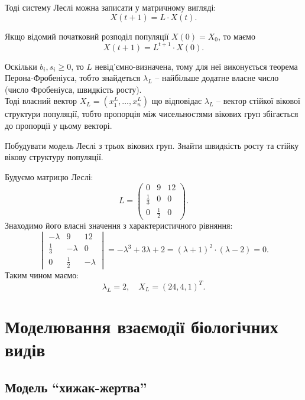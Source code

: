 Тоді систему Леслі можна записати у матричному вигляді:
\begin{equation}
    X(t + 1) = L \cdot X(t).
\end{equation}

Якщо відомий початковий розподіл популяції $X(0) = X_0$, то маємо 
\begin{equation}
    X(t + 1) = L^{t + 1} \cdot X(0).
\end{equation}

Оскільки $b_i, s_i \ge 0$, то $L$ невід'ємно-визначена, тому для неї виконується теорема Перона-Фробеніуса, тобто знайдеться $\lambda_L$ -- найбільше додатне власне число (число Фробеніуса, швидкість росту). \\

Тоді власний вектор $X_L = \left( x_1^L, \ldots, x_n^L \right)$ що відповідає $\lambda_L$ -- вектор стійкої вікової структури популяції, тобто пропорція між чисельностями вікових груп збігається до пропорції у цьому векторі.

\begin{example*}
    Побудувати модель Леслі з трьох вікових груп. Знайти швидкість росту та стійку вікову структуру популяції.
\end{example*}

\begin{solution}
    Будуємо матрицю Леслі:
    \[ L = \begin{pmatrix} 0 & 9 & 12 \\ \frac{1}{3} & 0 & 0 \\ 0 & \frac{1}{2} & 0 \end{pmatrix}. \]
    Знаходимо його власні значення з характеристичного рівняння:
    \[ \begin{vmatrix} - \lambda & 9 & 12 \\ \frac{1}{3} & - \lambda & 0 \\ 0 & \frac{1}{2} & - \lambda \end{vmatrix} = - \lambda^3 + 3 \lambda + 2 = ( \lambda + 1)^2 \cdot (\lambda - 2) = 0. \]
    Таким чином маємо:
    \[ \lambda_L = 2, \quad X_L = \left( 24, 4, 1 \right)^T. \]
\end{solution}

\section{Моделювання взаємодії біологічних видів}

\subsection{Модель ``хижак-жертва''}

